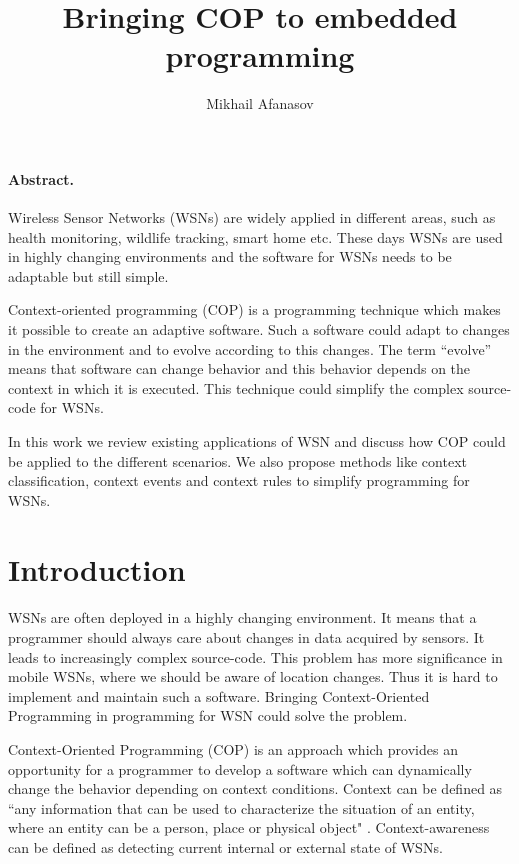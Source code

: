 \documentclass[12pt,a4paper]{article}
\title{Bringing COP to embedded programming}
\author{Mikhail Afanasov}
\begin{document}
\maketitle

\paragraph{Abstract.} Wireless Sensor Networks (WSNs) are widely applied in different areas, such as health monitoring, wildlife tracking, smart home etc. These days WSNs are used in highly changing environments and the software for WSNs needs to be adaptable but still simple. 

Context-oriented programming (COP) is a programming technique which makes it possible to create an adaptive software. Such a software could adapt to changes in the environment and to evolve according to this changes. The term ``evolve'' means that software can change behavior and this behavior depends on the context in which it is executed. This technique could simplify the complex source-code for WSNs.

In this work we review existing applications of WSN and discuss how COP could be applied to the different scenarios. We also propose methods like context classification, context events and context rules to simplify programming for WSNs.

\section{Introduction}
\paragraph{}
WSNs are often deployed in a highly changing environment. It  means that a programmer should always care about changes in data acquired by sensors. It leads to increasingly complex source-code. This problem has more significance in mobile WSNs, where we should be aware of location changes. Thus it is hard to implement and maintain such a software. Bringing Context-Oriented Programming in programming for WSN could solve the problem.

Context-Oriented Programming (COP) \cite{hirschfeld08} is an approach which provides an opportunity for a programmer to develop a software which can dynamically change the behavior depending on context conditions. Context can be defined as ``any information that can be used to characterize the situation of an entity, where an entity can be a person, place or physical object" \cite{dey99}. Context-awareness can be defined as detecting current internal or external state of WSNs.
\end{document}
